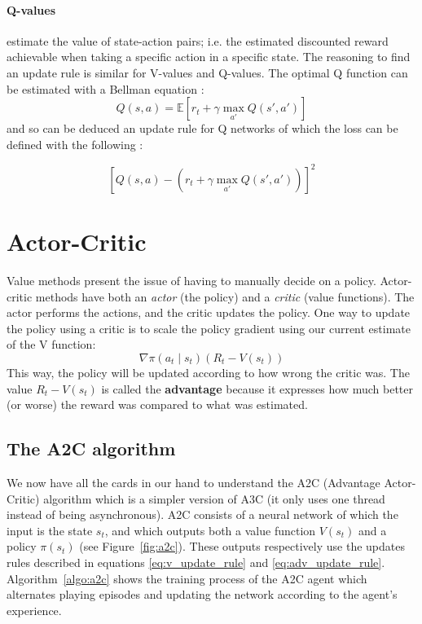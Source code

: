 \paragraph{Q-values} estimate the value of state-action pairs; i.e. the
estimated discounted reward achievable when taking a specific action in a 
specific state. The reasoning to find an update rule is similar for V-values
and Q-values. The optimal Q function can be estimated with a Bellman equation :
$$ Q(s, a) = \mathbb{E}\left[ r_t + \gamma \max\limits_{a'} Q(s', a') \right]$$
\noindent and so can be deduced an update rule for Q networks of which the loss
can be defined with the following :

\begin{equation}
	\label{eq:q_update_rule}
\left[Q(s, a) - \left( r_t + \gamma \max\limits_{a'} Q(s', a') \right) \right]^2
\end{equation}


\section{Actor-Critic}
Value methods present the issue of having to manually decide on a policy.
Actor-critic methods have both an \textit{actor} (the policy) and a
\textit{critic} (value functions). The actor performs the actions, and the 
critic updates the policy. One way to update the policy using a critic is to
scale the policy gradient using our current estimate of the V function:
\begin{equation}
	\label{eq:adv_update_rule}
\nabla \pi(a_t \mid s_t) (R_t - V(s_t))
\end{equation}
This way, the policy will be updated according to how wrong the critic was.
The value $R_t - V(s_t)$ is called the \textbf{advantage} 
because it expresses how much better (or worse) the reward was compared to 
what was estimated.


\subsection{The A2C algorithm}
We now have all the cards in our hand to understand the A2C
(Advantage Actor-Critic) algorithm which is a simpler version of A3C \cite{a3c}
(it only uses one thread instead of being asynchronous). 
A2C consists of a neural network
of which the input is the state $s_t$, and which outputs both a value function
$V(s_t)$ and a policy $\pi(s_t)$ (see Figure~\ref{fig:a2c}). These outputs
respectively use the updates rules described in equations \ref{eq:v_update_rule}
and \ref{eq:adv_update_rule}.  Algorithm~\ref{algo:a2c} shows the training
process of the A2C agent which alternates playing episodes and updating the
network according to the agent's experience.

